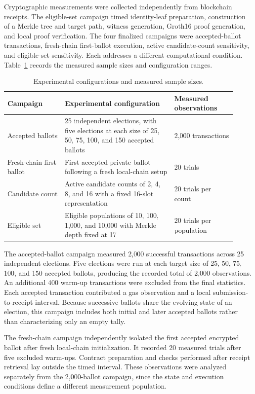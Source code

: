 Cryptographic measurements were collected independently from
blockchain receipts. The eligible-set campaign timed identity-leaf
preparation, construction of a Merkle tree and target path, witness
generation, Groth16 proof generation, and local proof verification.
The four finalized campaigns were accepted-ballot transactions,
fresh-chain first-ballot execution, active candidate-count
sensitivity, and eligible-set sensitivity. Each addresses a
different computational condition. Table~\ref{tab:implementation-campaigns}
records the measured sample sizes and configuration ranges.

\begin{table}[t]
\centering
\caption{Experimental configurations and measured sample sizes.}
\label{tab:implementation-campaigns}
\small
\begin{tabular}{@{}p{0.23\linewidth}p{0.44\linewidth}p{0.25\linewidth}@{}}
\toprule
\textbf{Campaign} &
\textbf{Experimental configuration} &
\textbf{Measured observations} \\
\midrule
Accepted ballots
& 25 independent elections, with five elections at each
size of 25, 50, 75, 100, and 150 accepted ballots
& 2,000 transactions \\
\addlinespace
Fresh-chain first ballot
& First accepted private ballot following a fresh
local-chain setup
& 20 trials \\
\addlinespace
Candidate count
& Active candidate counts of 2, 4, 8, and 16
with a fixed 16-slot representation
& 20 trials per count \\
\addlinespace
Eligible set
& Eligible populations of 10, 100, 1,000, and
10,000 with Merkle depth fixed at 17
& 20 trials per population \\
\bottomrule
\end{tabular}
\end{table}

The accepted-ballot campaign measured 2,000 successful
transactions across 25 independent elections. Five elections
were run at each target size of 25, 50, 75, 100, and 150
accepted ballots, producing the recorded total of 2,000
observations. An additional 400 warm-up transactions were
excluded from the final statistics. Each accepted transaction
contributed a gas observation and a local submission-to-receipt
interval. Because successive ballots share the evolving state
of an election, this campaign includes both initial and later
accepted ballots rather than characterizing only an empty tally.

The fresh-chain campaign independently isolated the first
accepted encrypted ballot after fresh local-chain initialization.
It recorded 20 measured trials after five excluded warm-ups.
Contract preparation and checks performed after receipt retrieval
lay outside the timed interval. These observations were
analyzed separately from the 2,000-ballot campaign, since the
state and execution conditions define a different measurement
population.

